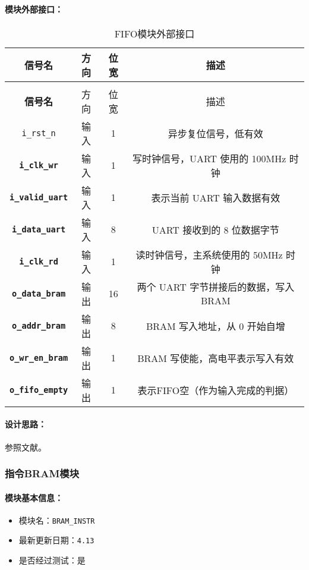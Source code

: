\documentclass[lang=cn,a4paper,newtx]{elegantpaper}
\begin{document}
\paragraph{模块外部接口：}
\begin{longtable}{>{\bfseries}c c c c}
  \caption{FIFO模块外部接口} \\
  \toprule
  信号名 & 方向 & 位宽 & 描述 \\
  \midrule
  \endfirsthead

  \multicolumn{4}{l}{\textbf{（续表）FIFO模块外部接口}} \\
  \toprule
  信号名 & 方向 & 位宽 & 描述 \\
  \midrule
  \endhead

  \texttt{i\_rst\_n}         & 输入  & 1        & 异步复位信号，低有效 \\
  \texttt{i\_clk\_wr}        & 输入  & 1        & 写时钟信号，UART 使用的 100MHz 时钟 \\
  \texttt{i\_valid\_uart}    & 输入  & 1        & 表示当前 UART 输入数据有效 \\
  \texttt{i\_data\_uart}     & 输入  & 8        & UART 接收到的 8 位数据字节 \\
  \texttt{i\_clk\_rd}        & 输入  & 1        & 读时钟信号，主系统使用的 50MHz 时钟 \\
  \texttt{o\_data\_bram}     & 输出  & 16       & 两个 UART 字节拼接后的数据，写入 BRAM \\
  \texttt{o\_addr\_bram}     & 输出  & 8        & BRAM 写入地址，从 0 开始自增 \\
  \texttt{o\_wr\_en\_bram}   & 输出  & 1        & BRAM 写使能，高电平表示写入有效 \\
  \texttt{o\_fifo\_empty}    & 输出   & 1       & 表示FIFO空（作为输入完成的判据）\\
  \bottomrule
\end{longtable}
\paragraph{设计思路：}

参照文献\cite{fifo}。

\subsubsection{指令BRAM模块}
\paragraph{模块基本信息：}
\begin{itemize}
  \item 模块名：\texttt{BRAM\_INSTR}
  \item 最新更新日期：\texttt{4.13}
  \item 是否经过测试：是
\end{itemize}
\end{document}
